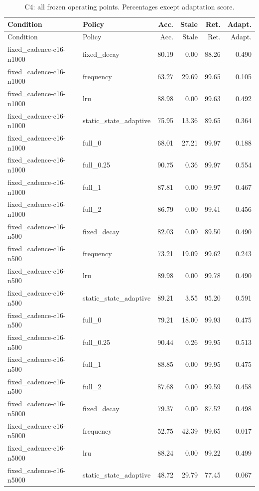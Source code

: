 \begin{longtable}{llrrrr}\caption{C4: all frozen operating points. Percentages except adaptation score.}\label{tab:C4}\\\toprule Condition & Policy & Acc. & Stale & Ret. & Adapt.\\\midrule\endfirsthead\toprule Condition & Policy & Acc. & Stale & Ret. & Adapt.\\\midrule\endhead
fixed\_cadence-c16-n1000 & fixed\_decay & 80.19 & 0.00 & 88.26 & 0.490\\
fixed\_cadence-c16-n1000 & frequency & 63.27 & 29.69 & 99.65 & 0.105\\
fixed\_cadence-c16-n1000 & lru & 88.98 & 0.00 & 99.63 & 0.492\\
fixed\_cadence-c16-n1000 & static\_state\_adaptive & 75.95 & 13.36 & 89.65 & 0.364\\
fixed\_cadence-c16-n1000 & full\_0 & 68.01 & 27.21 & 99.97 & 0.188\\
fixed\_cadence-c16-n1000 & full\_0.25 & 90.75 & 0.36 & 99.97 & 0.554\\
fixed\_cadence-c16-n1000 & full\_1 & 87.81 & 0.00 & 99.97 & 0.467\\
fixed\_cadence-c16-n1000 & full\_2 & 86.79 & 0.00 & 99.41 & 0.456\\
fixed\_cadence-c16-n500 & fixed\_decay & 82.03 & 0.00 & 89.50 & 0.490\\
fixed\_cadence-c16-n500 & frequency & 73.21 & 19.09 & 99.62 & 0.243\\
fixed\_cadence-c16-n500 & lru & 89.98 & 0.00 & 99.78 & 0.490\\
fixed\_cadence-c16-n500 & static\_state\_adaptive & 89.21 & 3.55 & 95.20 & 0.591\\
fixed\_cadence-c16-n500 & full\_0 & 79.21 & 18.00 & 99.93 & 0.475\\
fixed\_cadence-c16-n500 & full\_0.25 & 90.44 & 0.26 & 99.95 & 0.513\\
fixed\_cadence-c16-n500 & full\_1 & 88.85 & 0.00 & 99.95 & 0.475\\
fixed\_cadence-c16-n500 & full\_2 & 87.68 & 0.00 & 99.59 & 0.458\\
fixed\_cadence-c16-n5000 & fixed\_decay & 79.37 & 0.00 & 87.52 & 0.498\\
fixed\_cadence-c16-n5000 & frequency & 52.75 & 42.39 & 99.65 & 0.017\\
fixed\_cadence-c16-n5000 & lru & 88.24 & 0.00 & 99.22 & 0.499\\
fixed\_cadence-c16-n5000 & static\_state\_adaptive & 48.72 & 29.79 & 77.45 & 0.067\\

\end{longtable}
